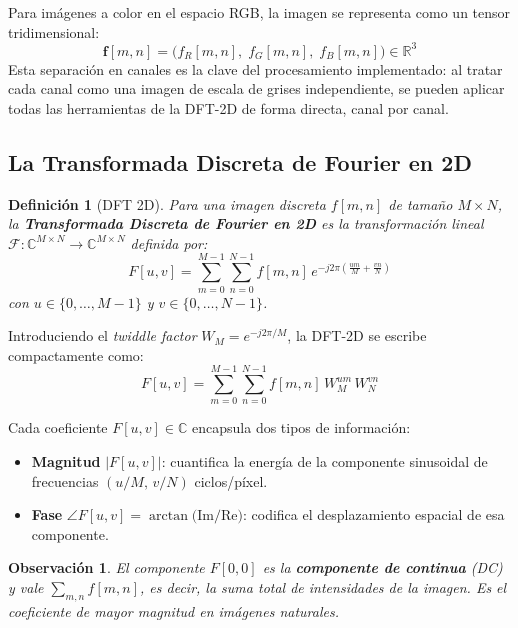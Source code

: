 \documentclass[conference]{IEEEtran}
\newtheorem{definicion}{Definición}
\newtheorem{observacion}{Observación}
\begin{document}
Para imágenes a color en el espacio RGB, la imagen se representa como un
tensor tridimensional:
\begin{equation}
  \mathbf{f}[m,n] = \bigl(f_R[m,n],\; f_G[m,n],\; f_B[m,n]\bigr) \in \mathbb{R}^3
  \label{eq:img_rgb}
\end{equation}
Esta separación en canales es la clave del procesamiento implementado: al
tratar cada canal como una imagen de escala de grises independiente, se
pueden aplicar todas las herramientas de la DFT-2D de forma directa,
canal por canal.

\subsection{La Transformada Discreta de Fourier en 2D}

\begin{definicion}[DFT 2D]
  Para una imagen discreta $f[m,n]$ de tamaño $M\times N$, la
  \textbf{Transformada Discreta de Fourier en 2D} es la transformación
  lineal $\mathcal{F}: \mathbb{C}^{M\times N}\to\mathbb{C}^{M\times N}$
  definida por:
  \begin{equation}
    F[u,v] = \sum_{m=0}^{M-1}\sum_{n=0}^{N-1}
             f[m,n]\,e^{-j2\pi\!\left(\frac{um}{M}+\frac{vn}{N}\right)}
    \label{eq:dft2d}
  \end{equation}
  con $u\in\{0,\ldots,M{-}1\}$ y $v\in\{0,\ldots,N{-}1\}$.
\end{definicion}

Introduciendo el \textit{twiddle factor} $W_M = e^{-j2\pi/M}$, la DFT-2D
se escribe compactamente como:
\begin{equation}
  F[u,v] = \sum_{m=0}^{M-1}\sum_{n=0}^{N-1}
           f[m,n]\,W_M^{um}\,W_N^{vn}
  \label{eq:dft2d_twiddle}
\end{equation}

Cada coeficiente $F[u,v]\in\mathbb{C}$ encapsula dos tipos de información:
\begin{itemize}
  \item \textbf{Magnitud} $|F[u,v]|$: cuantifica la energía de la componente
    sinusoidal de frecuencias $(u/M,\,v/N)$ ciclos/píxel.
  \item \textbf{Fase} $\angle F[u,v] = \arctan\!\bigl(\mathrm{Im}/\mathrm{Re}\bigr)$:
    codifica el desplazamiento espacial de esa componente.
\end{itemize}

\begin{observacion}
  El componente $F[0,0]$ es la \textbf{componente de continua} (DC) y
  vale $\sum_{m,n} f[m,n]$, es decir, la suma total de intensidades de la
  imagen. Es el coeficiente de mayor magnitud en imágenes naturales.
\end{observacion}
\end{document}
